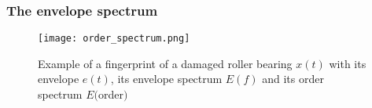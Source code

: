 \begin{frame}
    \frametitle{The envelope spectrum}
    \small
    
    \begin{figure}
        \centering
        \texttt{[image: order\_spectrum.png]}
        \caption{Example of a fingerprint of a damaged roller bearing $x(t)$ with its envelope $e(t)$, its envelope spectrum $E(f)$ and its order spectrum $E($order$)$}
        \label{fig:order_spectrum}
    \end{figure}
   
\end{frame}